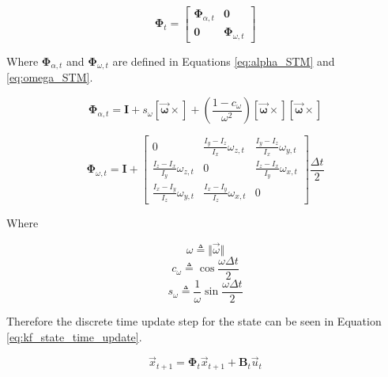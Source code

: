 \begin{equation} \label{eq:kf_statetrans_block}
    \boldsymbol{\Phi}_t = \begin{bmatrix}
        \boldsymbol{\Phi}_{\alpha,t} & \boldsymbol{0} \\
        \boldsymbol{0} & \boldsymbol{\Phi}_{\omega,t}
    \end{bmatrix}
\end{equation}

Where $\boldsymbol{\Phi}_{\alpha,t}$ and $\boldsymbol{\Phi}_{\omega,t}$ are defined in Equations \ref{eq:alpha_STM} and \ref{eq:omega_STM}.

\begin{equation} \label{eq:alpha_STM}
    \boldsymbol{\Phi}_{\alpha,t} = \boldsymbol{I} + s_{\omega} \boldsymbol{\left[ \vec{\omega} \times \right]} + \left( \frac{1 - c_{\omega}}{\omega ^2} \right) \boldsymbol{\left[ \vec{\omega} \times \right]} \boldsymbol{\left[ \vec{\omega} \times \right]}
\end{equation}

\begin{equation} \label{eq:omega_STM}
    \boldsymbol{\Phi}_{\omega,t} = \boldsymbol{I} + \begin{bmatrix}
        0 & \frac{I_y - I_z}{I_x} \omega_{z,t} & \frac{I_y - I_z}{I_x} \omega_{y,t} \\
        \frac{I_z - I_x}{I_y} \omega_{z,t} & 0 & \frac{I_z - I_x}{I_y} \omega_{x,t} \\
        \frac{I_x - I_y}{I_z} \omega_{y,t} & \frac{I_x - I_y}{I_z} \omega_{x,t} & 0
    \end{bmatrix} \frac{\Delta t}{2}
\end{equation}

Where

\begin{equation*}
    \omega \triangleq \Vert \vec{\omega} \Vert
\end{equation*}
\begin{equation*}
    c_{\omega} \triangleq \cos{\frac{\omega \Delta t}{2}}
\end{equation*}
\begin{equation*}
    s_{\omega} \triangleq \frac{1}{\omega} \sin{\frac{\omega \Delta t}{2}}
\end{equation*}

Therefore the discrete time update step for the state can be seen in Equation \ref{eq:kf_state_time_update}.

\begin{equation} \label{eq:kf_state_time_update}
    \vec{x}_{t + 1} = \boldsymbol{\Phi}_t \vec{x}_{t + 1} + \boldsymbol{B}_t \vec{u}_t
\end{equation}

